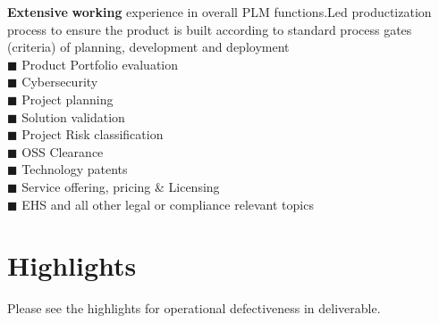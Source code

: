 \documentclass[]{cv-class}
\begin{document}
    \vspace{3mm} 
            { \textbf{Extensive} \textbf{working} experience in overall PLM functions.Led productization process to ensure the product is built according to standard process gates (criteria) of planning, development and deployment}\\
                                      $\blacksquare$ Product Portfolio evaluation\\
                                       $\blacksquare$ Cybersecurity\\
                                       $\blacksquare$ Project planning\\
                                       $\blacksquare$ Solution validation\\
                                       $\blacksquare$ Project Risk classification\\
                                       $\blacksquare$ OSS Clearance\\
                                       $\blacksquare$ Technology patents\\
                                       $\blacksquare$ Service offering, pricing \& Licensing\\
                                       $\blacksquare$ EHS and all other legal or compliance relevant topics\\
\section{Highlights}
Please see the highlights for operational defectiveness in deliverable.
\end{document}
